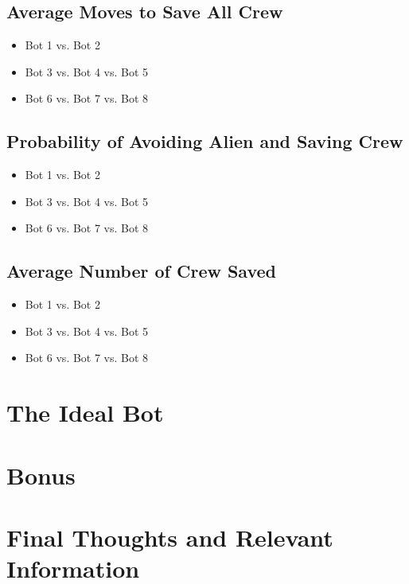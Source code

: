 \documentclass[11pt]{article}
\begin{document}
\subsection{Average Moves to Save All Crew}

\begin{itemize}
    \item Bot 1 vs. Bot 2
    \item Bot 3 vs. Bot 4 vs. Bot 5
    \item Bot 6 vs. Bot 7 vs. Bot 8
\end{itemize}

\subsection{Probability of Avoiding Alien and Saving Crew}

\begin{itemize}
    \item Bot 1 vs. Bot 2
    \item Bot 3 vs. Bot 4 vs. Bot 5
    \item Bot 6 vs. Bot 7 vs. Bot 8
\end{itemize}

\subsection{Average Number of Crew Saved}

\begin{itemize}
    \item Bot 1 vs. Bot 2
    \item Bot 3 vs. Bot 4 vs. Bot 5
    \item Bot 6 vs. Bot 7 vs. Bot 8
\end{itemize}


\section{The Ideal Bot}



\section{Bonus}



\section{Final Thoughts and Relevant Information}
\end{document}
